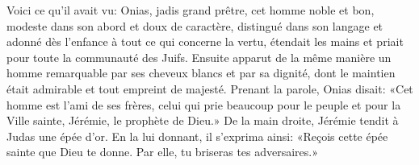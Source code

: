 Voici ce qu’il avait vu:
	Onias, jadis grand prêtre, cet homme noble et bon,
	modeste dans son abord et doux de caractère,
	distingué dans son langage et adonné dès l’enfance à tout ce qui concerne la vertu,
	étendait les mains et priait pour toute la communauté des Juifs.
Ensuite apparut de la même manière
	un homme remarquable par ses cheveux blancs et par sa dignité,
	dont le maintien était admirable et tout empreint de majesté.
Prenant la parole, Onias disait:
	«Cet homme est l’ami de ses frères,
	celui qui prie beaucoup pour le peuple et pour la Ville sainte,
	Jérémie, le prophète de Dieu.»
De la main droite, Jérémie tendit à Judas une épée d’or.
En la lui donnant, il s’exprima ainsi:
	«Reçois cette épée sainte que Dieu te donne. Par elle, tu briseras tes adversaires.»
